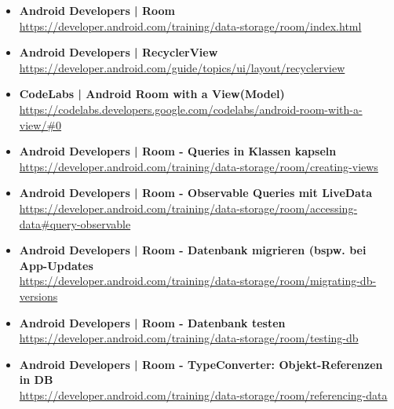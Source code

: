 \documentclass[a4paper]{article}
\begin{document}
{\begin{itemize}
		\item \textbf{Android Developers | Room}\\
		\href{https://developer.android.com/training/data-storage/room/index.html}
		{https://developer.android.com/training/data-storage/room/index.html}
		
		\item \textbf{Android Developers | RecyclerView}\\
		\href{https://developer.android.com/guide/topics/ui/layout/recyclerview}
		{https://developer.android.com/guide/topics/ui/layout/recyclerview}
		
		\item \textbf{CodeLabs | Android Room with a View(Model)}\\
		\href{https://codelabs.developers.google.com/codelabs/android-room-with-a-view/#0}
		{https://codelabs.developers.google.com/codelabs/android-room-with-a-view/\#0}
		
		\item \textbf{Android Developers | Room - Queries in Klassen kapseln}\\
		\href{https://developer.android.com/training/data-storage/room/creating-views}
		{https://developer.android.com/training/data-storage/room/creating-views}
		
		\item \textbf{Android Developers | Room - Observable Queries mit LiveData}\\
		\href{https://developer.android.com/training/data-storage/room/accessing-data#query-observable}
		{https://developer.android.com/training/data-storage/room/accessing-data\#query-observable}
		
		\item \textbf{Android Developers | Room - Datenbank migrieren (bspw. bei App-Updates}\\
		\href{https://developer.android.com/training/data-storage/room/migrating-db-versions}
		{https://developer.android.com/training/data-storage/room/migrating-db-versions}
		
		\item \textbf{Android Developers | Room - Datenbank testen}\\
		\href{https://developer.android.com/training/data-storage/room/testing-db}
		{https://developer.android.com/training/data-storage/room/testing-db}
		
		\item \textbf{Android Developers | Room - TypeConverter: Objekt-Referenzen in DB}\\
		\href{https://developer.android.com/training/data-storage/room/referencing-data}
		{https://developer.android.com/training/data-storage/room/referencing-data}
		

\end{itemize}}
\end{document}
